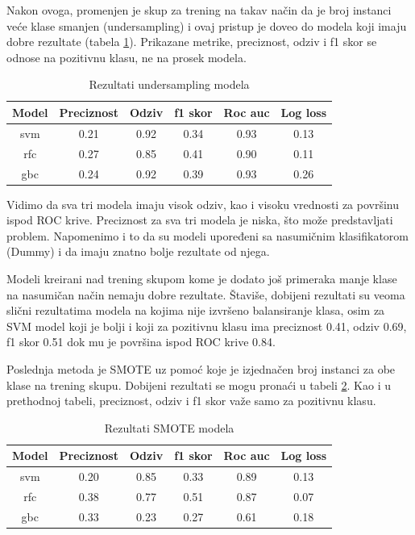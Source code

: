 \documentclass[a4paper]{article}
\begin{document}
Nakon ovoga, promenjen je skup za trening na takav način da je broj instanci
veće klase smanjen (undersampling) i ovaj pristup je doveo do modela koji imaju dobre rezultate (tabela \ref{tab:undersampling_pg}). Prikazane metrike, preciznost, odziv i f1 skor se odnose na pozitivnu klasu, ne na prosek modela.

\begin{table}[!h]
\begin{center}
\begin{tabular}{|c|c|c|c|c|c|} \hline
\textbf{Model} & \textbf{Preciznost} & \textbf{Odziv} & \textbf{f1 skor} & \textbf{Roc auc} & \textbf{Log loss} \\ \hline
svm & 0.21 & 0.92 & 0.34 & 0.93 & 0.13 \\ \hline
rfc & 0.27 & 0.85 & 0.41 & 0.90 & 0.11 \\ \hline
gbc & 0.24 & 0.92 & 0.39 & 0.93 & 0.26 \\ \hline
\end{tabular}
\caption{Rezultati undersampling modela}
\label{tab:undersampling_pg}
\end{center}
\end{table}

Vidimo da sva tri modela imaju visok odziv, kao i visoku vrednosti za površinu ispod ROC krive. Preciznost za sva tri modela je niska, što može predstavljati problem. Napomenimo i to da su modeli upoređeni sa nasumičnim klasifikatorom (Dummy) i da imaju znatno bolje rezultate od njega.

Modeli kreirani nad trening skupom kome je dodato još primeraka manje
klase na nasumičan način nemaju dobre rezultate. Štaviše, dobijeni rezultati
su veoma slični rezultatima modela na kojima nije izvršeno balansiranje klasa,
osim za SVM model koji je bolji i koji za pozitivnu klasu ima preciznost 0.41,
odziv 0.69, f1 skor 0.51 dok mu je površina ispod ROC krive 0.84.

Poslednja metoda je SMOTE uz pomoć koje je izjednačen broj instanci za obe klase na
trening skupu. Dobijeni rezultati se mogu pronaći u tabeli \ref{tab:smote_pg}. Kao i u prethodnoj tabeli, preciznost, odziv i f1 skor važe samo za pozitivnu klasu.

\begin{table}[!h]
\begin{center}
\begin{tabular}{|c|c|c|c|c|c|} \hline
\textbf{Model} & \textbf{Preciznost} & \textbf{Odziv} & \textbf{f1 skor} & \textbf{Roc auc} & \textbf{Log loss} \\ \hline
svm & 0.20 & 0.85 & 0.33 & 0.89 & 0.13 \\ \hline
rfc & 0.38 & 0.77 & 0.51 & 0.87 & 0.07 \\ \hline
gbc & 0.33 & 0.23 & 0.27 & 0.61 & 0.18 \\ \hline
\end{tabular}
\caption{Rezultati SMOTE modela}
\label{tab:smote_pg}
\end{center}
\end{table}
\end{document}
